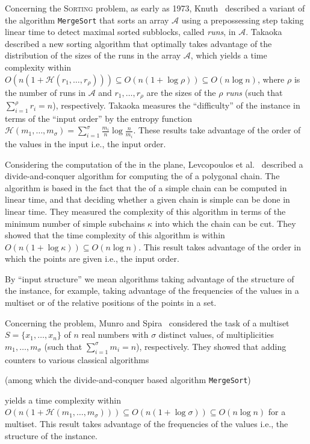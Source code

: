 Concerning the \textsc{Sorting} problem, as early as 1973,
Knuth~\cite{1973-BOOK-TheArtOfComputerProgrammingVol3-Knuth} described
a variant of the algorithm {\tt{MergeSort}} that sorts an array
$\mathcal{A}$ using a prepossessing step taking linear time to detect
maximal sorted subblocks, called \emph{runs}, in $\mathcal{A}$.
Takaoka~\cite{2009-Chapter-PartialSolutionAndEntropy-Takaoka}
described a new sorting algorithm that optimally takes advantage of
the distribution of the sizes of the runs in the array $\mathcal{A}$,
which yields a time complexity within
$O(n(1+\mathcal{H}(r_1, \dots, r_{\rho}))) \subseteq
O(n(1{+}\log{\rho})) \subseteq O(n\log{n})$, where $\rho$ is the
number of runs in $\mathcal{A}$ and $r_1, \dots, r_{\rho}$ are the
sizes of the $\rho$ \emph{runs} (such that $\sum_{i=1}^\rho {r_i}=n$),
respectively. Takaoka measures the ``difficulty'' of the instance in
terms of the ``input order'' by the entropy function
$\mathcal{H}(m_1, \dots, m_\sigma) =
\sum_{i=1}^\sigma{\frac{m_i}{n}}\log{\frac{n}{m_i}}$. These results
take advantage of the order of the values in the input i.e., the input
order.

Considering the computation of the {} in the plane, Levcopoulos et al.~\cite{2002-SWAT-AdaptiveAlgorithmsForConstructingConvexHullsAndTriangulationsOfPolygonalChains-LevcopoulosLingasMitchell} described a divide-and-conquer algorithm for computing the {} of a polygonal chain. The algorithm is based in the fact that the {} of a simple chain can be computed in linear time, and that deciding whether a given chain is simple can be done in linear time.
They measured the complexity of this algorithm in terms of the minimum
number of simple subchains $\kappa$ into which the chain can be cut.
They showed that the time complexity of this algorithm is within
$O(n(1{+}\log{\kappa})) \subseteq O(n\log{n})$. This result takes advantage of the order in which the points are given i.e., the input order.

By ``input structure'' we mean algorithms taking advantage of the structure of the instance, for example, taking advantage of the frequencies of the values in a multiset or of the relative positions of the points in a set.

Concerning the {} problem, Munro and
Spira~\cite{1976-JComp-SortingAndSearchingInMultisets-MunroSpira}
considered the task of {} a multiset
$S=\{x_1, \dots, x_n\}$ of $n$ real numbers with $\sigma$ distinct
values, of multiplicities $m_1, \dots, m_\sigma$ (such that
$\sum_{i=1}^\sigma {m_i}=n$), respectively. They showed that adding
counters to various classical algorithms
\begin{INUTILE}
  (among which the divide-and-conquer based algorithm
  {\tt{MergeSort}})
\end{INUTILE}
yields a time complexity within
$O(n(1+\mathcal{H}(m_1, \dots, m_\sigma))) \subseteq
O(n(1{+}\log{\sigma})) \subseteq O(n\log{n})$ for {} a
multiset. This result takes advantage of
the frequencies of the values i.e., the structure of the instance.

